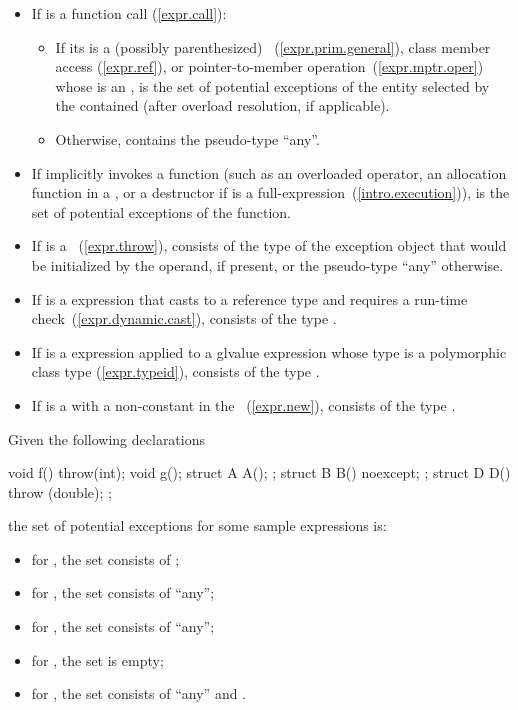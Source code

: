 \begin{itemize}
\item
If  is a function call (\ref{expr.call}):
\begin{itemize}
\item
If its  is a (possibly parenthesized)
~(\ref{expr.prim.general}), class member access
(\ref{expr.ref}), or pointer-to-member operation~(\ref{expr.mptr.oper})
whose  is an ,
 is the set of potential exceptions of the entity selected by the
contained  (after overload resolution, if applicable).
\item
Otherwise,  contains the pseudo-type ``any''.
\end{itemize}

\item
If  implicitly invokes a function (such as an overloaded operator,
an allocation function in a , or a destructor
if  is a full-expression~(\ref{intro.execution})),
 is the set of potential exceptions of the function.
\item
If  is a ~(\ref{expr.throw}),
 consists of the type of the exception object that would be
initialized by the operand, if present, or the pseudo-type ``any'' otherwise.
\item
If  is a  expression that casts to a reference type and
requires a run-time check~(\ref{expr.dynamic.cast}),
 consists of the type .
\item
If  is a  expression applied to a glvalue expression whose
type is a polymorphic class type (\ref{expr.typeid}),
 consists of the type .
\item
If  is a  with a non-constant
 in the ~(\ref{expr.new}),
 consists of the type .
\end{itemize}

\enterexample
Given the following declarations
\begin{codeblock}
  void f() throw(int); 
  void g();  
  struct A { A(); };
  struct B { B() noexcept; };
  struct D { D() throw (double); };
\end{codeblock}
the set of potential exceptions for some sample expressions is:
\begin{itemize}
\item
for , the set consists of ;
\item
for , the set consists of ``any'';
\item
for , the set consists of ``any'';
\item
for , the set is empty;
\item
for , the set consists of ``any'' and .
\end{itemize}
\exitexample

